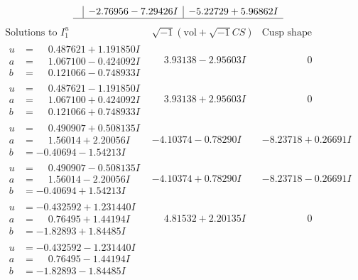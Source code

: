 \documentclass[1p]{elsarticle_modified}
\theoremstyle{definition}
\newcommand{\I}{\sqrt{-1}}
\begin{document}
$$\begin{array}{c|c|c}
 & -2.76956 - 7.29426 I & -5.22729 + 5.96862 I\\
 \hline 
 \end{array}$$\newpage$$\begin{array}{c|c|c}  
\text{Solutions to }I^u_{1}& \I (\text{vol} + \sqrt{-1}CS) & \text{Cusp shape}\\
 \hline 
\begin{aligned}
u &= \phantom{-}0.487621 + 1.191850 I \\
a &= \phantom{-}1.067100 - 0.424092 I \\
b &= \phantom{-}0.121066 - 0.748933 I\end{aligned}
 & \phantom{-}3.93138 - 2.95603 I & \phantom{-0.000000 } 0 \\ \hline\begin{aligned}
u &= \phantom{-}0.487621 - 1.191850 I \\
a &= \phantom{-}1.067100 + 0.424092 I \\
b &= \phantom{-}0.121066 + 0.748933 I\end{aligned}
 & \phantom{-}3.93138 + 2.95603 I & \phantom{-0.000000 } 0 \\ \hline\begin{aligned}
u &= \phantom{-}0.490907 + 0.508135 I \\
a &= \phantom{-}1.56014 + 2.20056 I \\
b &= -0.40694 - 1.54213 I\end{aligned}
 & -4.10374 - 0.78290 I & -8.23718 + 0.26691 I \\ \hline\begin{aligned}
u &= \phantom{-}0.490907 - 0.508135 I \\
a &= \phantom{-}1.56014 - 2.20056 I \\
b &= -0.40694 + 1.54213 I\end{aligned}
 & -4.10374 + 0.78290 I & -8.23718 - 0.26691 I \\ \hline\begin{aligned}
u &= -0.432592 + 1.231440 I \\
a &= \phantom{-}0.76495 + 1.44194 I \\
b &= -1.82893 + 1.84485 I\end{aligned}
 & \phantom{-}4.81532 + 2.20135 I & \phantom{-0.000000 } 0 \\ \hline\begin{aligned}
u &= -0.432592 - 1.231440 I \\
a &= \phantom{-}0.76495 - 1.44194 I \\
b &= -1.82893 - 1.84485 I\end{aligned}

\end{array}$$
\end{document}
